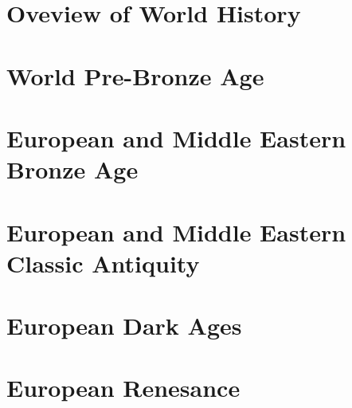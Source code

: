 \documentclass{article}
\begin{document}


\section{Oveview of World History}

\newpage
\begin{timeline}[\textwidth][24][250][-3300][2025]
\end{timeline}

\section{World Pre-Bronze Age}

\section{European and Middle Eastern Bronze Age}

\section{European and Middle Eastern Classic Antiquity}

%
%


\section{European Dark Ages}

\section{European Renesance}
\end{document}
